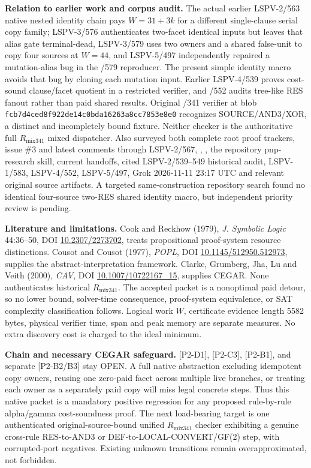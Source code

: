 \documentclass[11pt]{article}
\begin{document}
\par
\textbf{Relation to earlier work and corpus audit.} The actual earlier LSPV-2/563 native nested identity chain pays $W=31+3k$ for a different single-clause serial copy family; LSPV-3/576 authenticates two-facet identical inputs but leaves that alias gate terminal-dead, LSPV-3/579 uses two owners and a shared false-unit to copy four sources at $W=44$, and LSPV-5/497 independently repaired a mutation-alias bug in the /579 reproducer. The present simple identity macro avoids that bug by cloning each mutation input. Earlier LSPV-4/539 proves cost-sound clause/facet quotient in a restricted verifier, and /552 audits tree-like RES fanout rather than paid shared results. Original /341 verifier at blob \texttt{fcb7d4ced8f922de14c0bda16263a8cc7853e8e0} recognizes SOURCE/AND3/XOR, a distinct and incompletely bound fixture. Neither checker is the authoritative full $R_{\mathrm{mix341}}$ mixed dispatcher. Also surveyed both complete root proof trackers, issue \#3 and latest comments through LSPV-2/567, , , the repository pnp-research skill, current handoffs, cited LSPV-2/539--549 historical audit, LSPV-1/583, LSPV-4/552, LSPV-5/497, Grok 2026-11-11 23:17 UTC and relevant original source artifacts. A targeted same-construction repository search found no identical four-source two-RES shared identity macro, but independent priority review is pending.
\par
\textbf{Literature and limitations.} Cook and Reckhow (1979), \emph{J. Symbolic Logic} 44:36--50, DOI \href{https://doi.org/10.2307/2273702}{10.2307/2273702}, treats propositional proof-system resource distinctions. Cousot and Cousot (1977), \emph{POPL}, DOI \href{https://doi.org/10.1145/512950.512973}{10.1145/512950.512973}, supplies the abstract-interpretation framework. Clarke, Grumberg, Jha, Lu and Veith (2000), \emph{CAV}, DOI \href{https://doi.org/10.1007/10722167_15}{10.1007/10722167\_15}, supplies CEGAR. None authenticates historical $R_{\mathrm{mix341}}$. The accepted packet is a nonoptimal paid detour, so no lower bound, solver-time consequence, proof-system equivalence, or SAT complexity classification follows. Logical work $W$, certificate evidence length 5582 bytes, physical verifier time, span and peak memory are separate measures. No extra discovery cost is charged to the ideal minimum.
\par
\textbf{Chain and necessary CEGAR safeguard.} [P2-D1], [P2-C3], [P2-B1], and separate [P2-B2/B3] stay OPEN. A full native abstraction excluding idempotent copy owners, reusing one zero-paid facet across multiple live branches, or treating each owner as a separately paid copy will miss legal concrete steps. Thus this native packet is a mandatory positive regression for any proposed rule-by-rule alpha/gamma cost-soundness proof. The next load-bearing target is one authenticated original-source-bound unified $R_{\mathrm{mix341}}$ checker exhibiting a genuine cross-rule RES-to-AND3 or DEF-to-LOCAL-CONVERT/GF(2) step, with corrupted-port negatives. Existing unknown transitions remain overapproximated, not forbidden.
\end{document}
